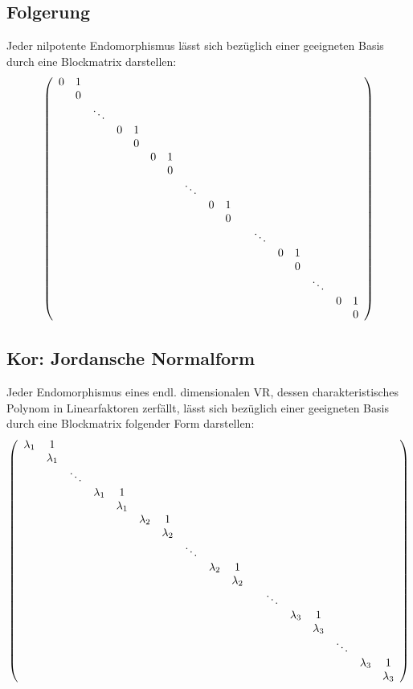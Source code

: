 \documentclass[titlepage,12pt,a4paper,ngerman]{report}
\begin{document}
\subsection{Folgerung}
Jeder nilpotente Endomorphismus lässt sich bezüglich  einer geeigneten Basis durch eine Blockmatrix darstellen:
$$\left (\begin{array}{*{20}c}
0 & 1\\
& 0 \\
& & \ddots\\
& & & 0 & 1\\
& & & & 0\\
& & & & & 0 & 1\\
& & & & & & 0 \\
& & & & & & & \ddots\\
& & & & & & & & 0 & 1\\
& & & & & & & & & 0\\
& & & & & & & & & & & \ddots \\
& & & & & & & & & & & & 0 & 1\\ 
& & & & & & & & & & & & & 0 \\ 
& & & & & & & & & & & & & & \ddots\\ 
& & & & & & & & & & & & & & & 0 & 1\\ 
& & & & & & & & & & & & & & & & 0\\
\end{array} \right)$$

\subsection{Kor: Jordansche Normalform}
Jeder Endomorphismus eines endl. dimensionalen VR, dessen charakteristisches Polynom in Linearfaktoren zerfällt, lässt sich bezüglich einer geeigneten Basis durch eine Blockmatrix folgender Form darstellen:
$$\left (\begin{array}{*{20}c}
\lambda_1 & 1\\
& \lambda_1 \\
& & \ddots\\
& & & \lambda_1 & 1\\
& & & & \lambda_1\\
& & & & & \lambda_2 & 1\\
& & & & & & \lambda_2 \\
& & & & & & & \ddots\\
& & & & & & & & \lambda_2 & 1\\
& & & & & & & & & \lambda_2\\
& & & & & & & & & & & \ddots \\
& & & & & & & & & & & & \lambda_3 & 1\\ 
& & & & & & & & & & & & & \lambda_3 \\ 
& & & & & & & & & & & & & & \ddots\\ 
& & & & & & & & & & & & & & & \lambda_3 & 1\\ 
& & & & & & & & & & & & & & & & \lambda_3\\
\end{array} \right)$$
\end{document}

